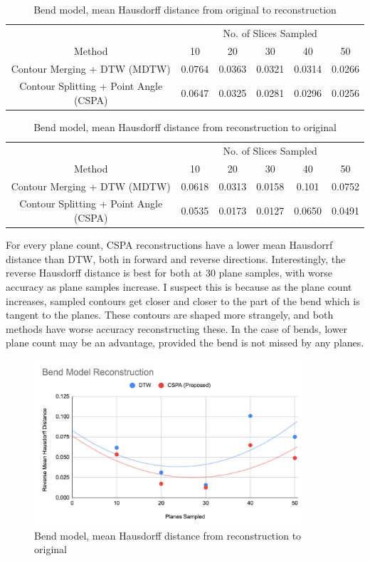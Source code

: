 \documentclass[11p, titlepage]{article}
\begin{document}
\begin{table}[h!]
\begin{tabular}{ | c | c | c | c | c | c | }
\hline
& \multicolumn{5}{c|}{No. of Slices Sampled} \\
\cline{2-6}
Method & 10 & 20 & 30 & 40 & 50 \\
\hline
Contour Merging + DTW (MDTW) & 0.0764 & 0.0363 & 0.0321 & 0.0314 & 0.0266 \\
Contour Splitting + Point Angle (CSPA) & 0.0647 & 0.0325 & 0.0281 & 0.0296 & 0.0256 \\
\hline
\end{tabular}
\caption{Bend model, mean Hausdorff distance from original to reconstruction}
\label{table:bend_forward}
\end{table}

\begin{table}[h!]
\begin{tabular}{ | c | c | c | c | c | c | }
\hline
& \multicolumn{5}{c|}{No. of Slices Sampled} \\
\cline{2-6}
Method & 10 & 20 & 30 & 40 & 50 \\
\hline
Contour Merging + DTW (MDTW) & 0.0618 & 0.0313 & 0.0158 & 0.101 & 0.0752 \\
Contour Splitting + Point Angle (CSPA) & 0.0535 & 0.0173 & 0.0127 & 0.0650 & 0.0491 \\
\hline
\end{tabular}
\caption{Bend model, mean Hausdorff distance from reconstruction to original}
\label{table:bend_reverse}
\end{table}

For every plane count, CSPA reconstructions have a lower mean Hausdorrf distance than DTW, both in forward and reverse directions. Interestingly, the reverse Hausdorff distance is best for both at 30 plane samples, with worse accuracy as plane samples increase. I suspect this is because as the plane count increases, sampled contours get closer and closer to the part of the bend which is tangent to the planes. These contours are shaped more strangely, and both methods have worse accuracy reconstructing these. In the case of bends, lower plane count may be an advantage, provided the bend is not missed by any planes.

\begin{figure}[h!]
\centering
\includegraphics[width=0.9\textwidth]{graphs/bend-reverse}
\caption{Bend model, mean Hausdorff distance from reconstruction to original\label{fig:bend_reverse_graph}}
\end{figure}
\end{document}
